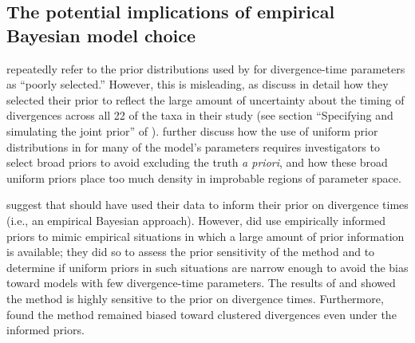 \documentclass[letterpaper,12pt]{article}
\begin{document}
\begin{linenumbers}






\section*{The potential implications of empirical Bayesian model choice}
\citet{Hickerson2013} repeatedly refer to the prior distributions used by
\citet{Oaks2012} for divergence-time parameters as ``poorly selected.''
However, this is misleading, as \citet{Oaks2012} discuss in detail how they
selected their prior to reflect the large amount of uncertainty about the
timing of divergences across all 22 of the taxa in their study (see section
``Specifying and simulating the joint prior'' of \citet{Oaks2012}).
\citet{Oaks2012} further discuss how the use of uniform prior distributions in
\msb for many of the model's parameters requires investigators to select broad
priors to avoid excluding the truth \textit{a priori}, and how these broad
uniform priors place too much density in improbable regions of parameter space.

\citet{Hickerson2013} suggest that \citet{Oaks2012} should have used their
data to inform their prior on divergence times (i.e., an empirical Bayesian
approach).
However, \citet{Oaks2012} did use empirically informed priors to mimic
empirical situations in which a large amount of prior information is available;
they did so to assess the prior sensitivity of the method and to determine if
uniform priors in such situations are narrow enough to avoid the bias toward
models with few divergence-time parameters.
The results of \citet{Oaks2012} and \citet{Hickerson2013} showed the method is
highly sensitive to the prior on divergence times.
Furthermore, \citet{Oaks2012} found the method remained biased toward clustered
divergences even under the informed priors.


\end{linenumbers}
\end{document}
